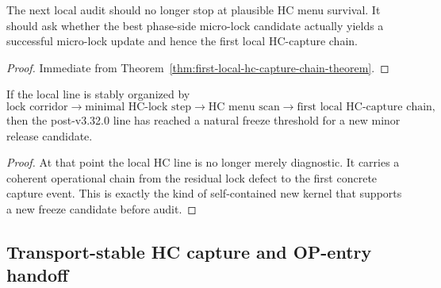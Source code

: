 \begin{corollary}
\label{cor:current-hc-capture-working-rule}
The next local audit should no longer stop at plausible HC menu survival. It should ask whether the best phase-side micro-lock candidate actually yields a successful micro-lock update and hence the first local HC-capture chain.
\end{corollary}

\begin{proof}
Immediate from Theorem~\ref{thm:first-local-hc-capture-chain-theorem}.
\end{proof}

\begin{corollary}
\label{cor:freeze-threshold-after-v3320}
If the local line is stably organized by
\[
  \text{lock corridor}
  \to
  \text{minimal HC-lock step}
  \to
  \text{HC menu scan}
  \to
  \text{first local HC-capture chain},
\]
then the post-v3.32.0 line has reached a natural freeze threshold for a new minor release candidate.
\end{corollary}

\begin{proof}
At that point the local HC line is no longer merely diagnostic. It carries a coherent operational chain from the residual lock defect to the first concrete capture event. This is exactly the kind of self-contained new kernel that supports a new freeze candidate before audit.
\end{proof}



\subsection{Transport-stable HC capture and OP-entry handoff}
\label{subsec:transport-stable-hc-capture-op-entry-handoff}

